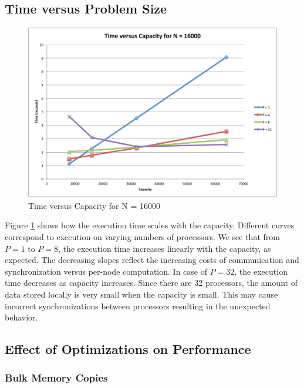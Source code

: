 \documentclass[11pt]{article} %
\begin{document}
\subsection{Time versus Problem Size}

\begin{figure}
\begin{centering}
\includegraphics[width=0.5\paperwidth]{figures/TvsC.pdf}
\caption{Time versus Capacity for N = 16000}
\label{TvsC}
\end{centering}
\end{figure}

Figure \ref{TvsC} shows how the execution time scales with the capacity. Different curves correspond to execution on varying numbers of processors. We see that from $P = 1$ to $P = 8$, the execution time increases linearly with the capacity, as expected. The decreasing slopes reflect the increasing costs of communication and synchronization versus per-node computation. In case of $P = 32$, the execution time decreases as capacity increases. Since there are 32 processors, the amount of data stored locally is very small when the capacity is small. This may cause incorrect synchronizations between processors resulting in the unexpected behavior.

\subsection{Effect of Optimizations on Performance}

\subsubsection{Bulk Memory Copies}
\end{document}
